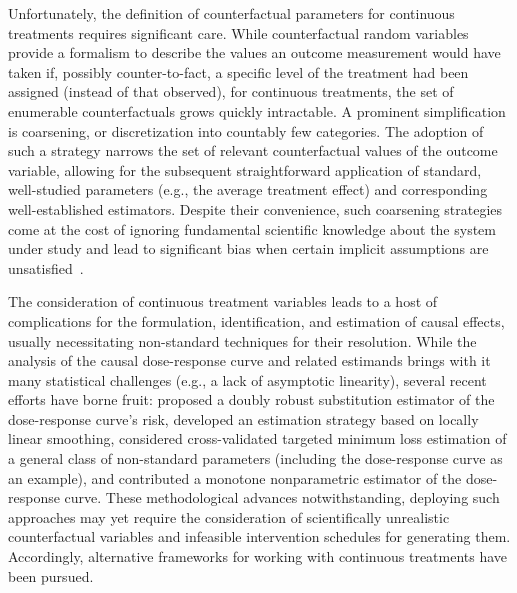 Unfortunately, the definition of counterfactual parameters for continuous
treatments requires significant care. While counterfactual random variables
provide a formalism to describe the values an outcome measurement would have
taken if, possibly counter-to-fact, a specific level of the treatment had been
assigned (instead of that observed), for continuous treatments, the set of
enumerable counterfactuals grows quickly intractable. A prominent
simplification is coarsening, or discretization into countably few categories.
The adoption of such a strategy narrows the set of relevant counterfactual
values of the outcome variable, allowing for the subsequent straightforward
application of standard, well-studied parameters (e.g., the average treatment
effect) and corresponding well-established estimators. Despite their
convenience, such coarsening strategies come at the cost of ignoring fundamental
scientific knowledge about the system under study and lead to significant bias
when certain implicit assumptions are unsatisfied~\citep{stitelman2010impact}.

The consideration of continuous treatment variables leads to a host of
complications for the formulation, identification, and estimation of causal
effects, usually necessitating non-standard techniques for their resolution.
While the analysis of the causal dose-response curve and related estimands
brings with it many statistical challenges (e.g., a lack of asymptotic
linearity), several recent efforts have borne fruit: \citet{diaz2013targeted}
proposed a doubly robust substitution estimator of the dose-response curve's
risk, \citet{kennedy2017nonparametric} developed an estimation strategy based on
locally linear smoothing, \citet{vdl2018cvtmle} considered cross-validated
targeted minimum loss estimation of a general class of non-standard parameters
(including the dose-response curve as an example), and
\citet{westling2020causal} contributed a monotone nonparametric estimator of the
dose-response curve. These methodological advances notwithstanding, deploying
such approaches may yet require the consideration of scientifically unrealistic
counterfactual variables and infeasible intervention schedules for generating
them. Accordingly, alternative frameworks for working with continuous
treatments have been pursued.


